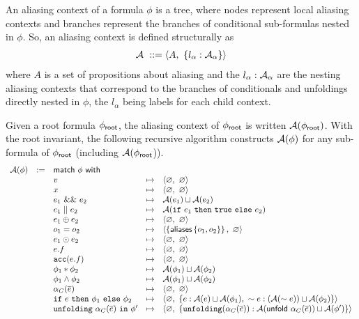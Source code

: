 An aliasing context of a formula $\phi$ is a tree, where nodes represent local aliasing contexts and branches represent the branches of conditional sub-formulas nested in $\phi$. So, an aliasing context is defined structurally as
\begin{align*}
  \mathcal{A} \ ::= \langle A ,\ \left\{ l_\alpha : \mathcal{A}_\alpha \right\} \rangle
\end{align*}
where $A$ is a set of propositions about aliasing and the $l_\alpha : \mathcal{A}_\alpha$ are the nesting aliasing contexts that correspond to the branches of conditionals and unfoldings directly nested in $\phi$, the $l_\alpha$ being labels for each child context.

Given a root formula $\phi_\textsf{root}$, the aliasing context of $\phi_\textsf{root}$ is written $\mathcal{A}(\phi_\textsf{root})$. With the root invariant, the following recursive algorithm constructs $\mathcal{A}(\phi)$ for any sub-formula of $\phi_\textsf{root}$ (including $\mathcal{A}(\phi_\textsf{root}$)).
%
\begin{align*}
\begin{array}{rclcl}
\A(\phi) &:=& \tsf{match} \ \phi \ \tsf{with} \\
&& v &\mt&
  \context{\empty}{\empty}
\\
&& x &\mt&
  \context{\empty}{\empty}
\\
&& e_1 \ \band \ e_2 &\mt&
  \A(e_1) \contextunion \A(e_2)
\\
&& e_1 \bor e_2 &\mt&
  \A( \cif \ e_1 \ \cthen \ \ctrue \ \celse \ e_2 )
\\
&& e_1 \oplus e_2 &\mt&
  \context{\empty}{\empty}
\\
&& o_1 = o_2 &\mt&
  \context{\set{\aliases\set{o_1, o_2}}}{\empty} %
\\
&& e_1 \odot e_2 &\mt&
  \context{\empty}{\empty}
\\
&& e.f &\mt&
  \context{\empty}{\empty}
\\
&& \cacc(e.f) &\mt&
  \context{\empty}{\empty}
\\
&& \phi_1 \ast \phi_2 &\mt&
  \A(\phi_1) \contextunion \A(\phi_2)
\\
&& \phi_1 \land \phi_2 &\mt&
  \A(\phi_1) \contextunion \A(\phi_2)
\\
&& \alpha_C(\vec{e}) &\mt&
  \context{\empty}{\empty}
\\
&& \cif \ e \ \cthen \ \phi_1 \ \celse \ \phi_2 &\mt&
  \context{\empty}{\set{ e : \A(e) \contextunion \A(\phi_1) ,\ \pnot e : (\A(\pnot e)) \contextunion \A(\phi_2) }}
\\
&& \cunfolding \ \alpha_C(\vec{e}) \ \cin \ \phi\p &\mt&
  \context{\empty}{\set{ \cunfolding(\alpha_C(\vec{e})) : \A(\tsf{unfold} \ \alpha_C(\vec{e})) \contextunion \A(\phi\p) }}
\end{array}
\end{align*}
